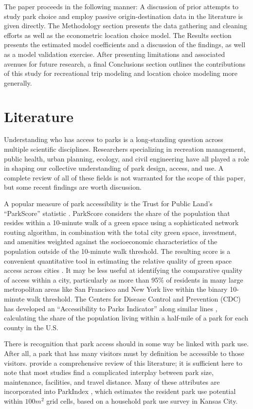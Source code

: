 \documentclass[]{elsarticle} %
\begin{document}
The paper proceeds in the following manner: A discussion of prior attempts to
study park choice and employ passive origin-destination data in the literature
is given directly. The Methodology section presents the data gathering and
cleaning efforts as well as the econometric location choice model. The Results
section presents the estimated model coefficients and a discussion of the
findings, as well as a model validation exercise. After presenting limitations
and associated avenues for future research, a final Conclusions section
outlines the contributions of this study for recreational trip modeling and
location choice modeling more generally.

\hypertarget{literature}{%
\section{Literature}\label{literature}}

Understanding who has access to parks is a long-standing question across
multiple scientific disciplines. Researchers specializing in recreation
management, public health, urban planning, ecology, and civil engineering have
all played a role in shaping our collective understanding of park design,
access, and use. A complete review of all of these fields is not warranted for
the scope of this paper, but some recent findings are worth discussion.

A popular measure of park accessibility is the Trust for Public Land's
``ParkScore'' statistic \citep{parkscore2019}. ParkScore considers the share of the
population that resides within a 10-minute walk of a green space using a
sophisticated network routing algorithm, in combination with the total city
green space, investment, and amenities weighted against the socioeconomic
characteristics of the population outside of the 10-minute walk threshold. The
resulting score is a convenient quantitative tool in estimating the relative
quality of green space access across cities \citep{Rigolon2018}. It may be less
useful at identifying the comparative quality of access within a city,
particularly as more than 95\% of residents in many large metropolitan areas like
San Francisco and New York live within the binary 10-minute walk threshold. The
Centers for Disease Control and Prevention (CDC) has developed an ``Accessibility
to Parks Indicator'' along similar lines \citep{Ussery2016}, calculating the share of
the population living within a half-mile of a park for each county in the U.S.

There is recognition that park access should in some way be linked with park
use. After all, a park that has many visitors must by definition be accessible
to those visitors. \citet{McCormack2010} provide a comprehensive review of this
literature; it is sufficient here to note that most studies find a complicated
interplay between park size, maintenance, facilities, and travel distance. Many
of these attributes are incorporated into ParkIndex \citep{Kaczynski2016}, which
estimates the resident park use potential within \(100 m^2\) grid cells, based on
a household park use survey in Kansas City.
\end{document}
